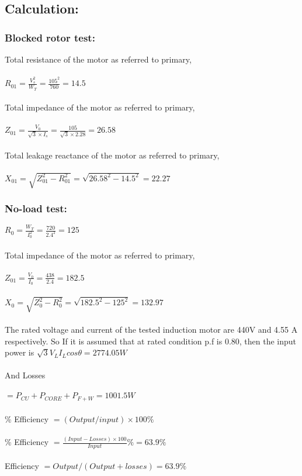 \documentclass[12pt]{article}
\begin{document}
\subsection{Calculation:}
\subsubsection*{Blocked rotor test:}
Total resistance of the motor as referred to primary,\\\\
\(R_{01} = \frac{V_s^2}{W_T} = \frac{105^2}{760}=14.5\)\\\\
Total impedance of the motor as referred to primary,\\\\
\(Z_{01} = \frac{V_0}{\sqrt{3}\times I_s} = \frac{105}{\sqrt{3} \times 2.28}=26.58\)\\\\
Total leakage reactance of the motor as referred to primary,\\\\
\(X_{01} = \sqrt{Z_{01}^2 - R_{01}^2} = \sqrt{26.58^2 - 14.5^2}= 22.27\)

\subsubsection*{No-load test:}
\(R_{0} = \frac{W_T}{I_0^2} = \frac{720}{2.4^2}=125\)\\\\
Total impedance of the motor as referred to primary,\\\\
\(Z_{01} = \frac{V_0}{I_0} = \frac{438}{2.4} = 182.5\)\\\\
\(X_{0} = \sqrt{Z_0^2 - R_0^2} = \sqrt{182.5^2 - 125^2}= 132.97\)
\\\\
The rated voltage and current of the tested induction motor are 440V and 4.55 A respectively. So If it is assumed that at rated condition p.f is 0.80, then the input power is \(\sqrt{3}V_LI_L cos\theta = 2774.05 W\)\\\\
And Losses\\\\
\(= P_{CU}+P_{CORE} + P_{F+W} =1001.5 W\)\\\\
\% Efficiency \(=( Output/ input)\times100\%\)\\\\
\% Efficiency \( = \frac{(Input- Losses) \times100}{Input} \% = 63.9 \%\)\\\\
Efficiency \(= Output/ (Output + losses)= 63.9\%\)
\end{document}
